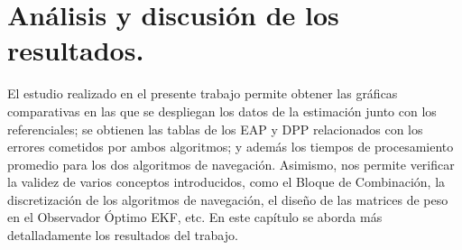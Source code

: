 \documentclass[conference]{IEEEtran}
\begin{document}
\section{Análisis y discusión de los resultados.}
El estudio realizado en el presente trabajo permite obtener las gráficas comparativas en las que se despliegan los datos de la estimación junto con los referenciales; se obtienen las tablas de los EAP y DPP relacionados con los errores cometidos por ambos algoritmos; y además los tiempos de procesamiento promedio para los dos algoritmos de navegación. Asimismo, nos permite verificar la validez de varios conceptos introducidos, como el Bloque de Combinación, la discretización de los algoritmos de navegación, el diseño de las matrices de peso en el Observador Óptimo EKF, etc. En este capítulo se aborda más detalladamente los resultados del trabajo.\par
\end{document}
